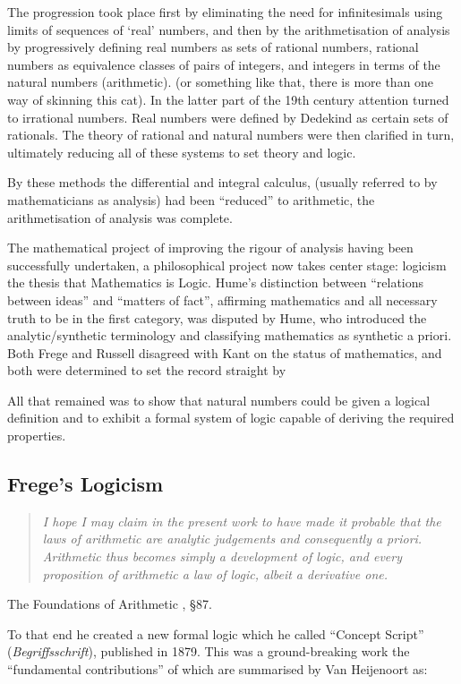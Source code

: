 \documentclass[10pt,titlepage]{article}
\begin{document}
The progression took place first by eliminating the need for infinitesimals using limits of sequences of `real' numbers, and then by the arithmetisation of analysis by progressively defining real numbers as sets of rational numbers, rational numbers as equivalence classes of pairs of integers, and integers in terms of the natural numbers (arithmetic). (or something like that, there is more than one way of skinning this cat).
In the latter part of the 19th century attention turned to irrational numbers.
Real numbers were defined by Dedekind as certain sets of rationals.
The theory of rational and natural numbers were then clarified in turn, ultimately reducing all of these systems to set theory and logic.

By these methods the differential and integral calculus, (usually referred to by mathematicians as analysis) had been ``reduced'' to arithmetic, the arithmetisation of analysis was complete.

The mathematical project of improving the rigour of analysis having been successfully undertaken, a philosophical project now takes center stage: logicism the thesis that Mathematics is Logic.
Hume's distinction between ``relations between ideas'' and ``matters of fact'', affirming mathematics and all necessary truth to be in the first category, was disputed by Hume, who introduced the analytic/synthetic terminology and classifying mathematics as synthetic a priori.
Both Frege and Russell disagreed with Kant on the status of mathematics, and both were determined to set the record straight by

All that remained was to show that natural numbers could be given a logical definition and to exhibit a formal system of logic capable of deriving the required properties.

\subsection{Frege's Logicism}

\begin{quote}
{\it  I hope I may claim in the present work to have made it probable that the laws of arithmetic are analytic judgements and consequently \emph{a priori}.
Arithmetic thus becomes simply a development of logic, and every proposition of arithmetic a law of logic, albeit a derivative one.}
\end{quote}
The Foundations of Arithmetic \cite{frege1884}, §87.

To that end he created a new formal logic which he called ``Concept Script'' ({\it Begriffsschrift})\cite{heijenoort67,frege1879}, published in 1879.
This was a ground-breaking work the ``fundamental contributions'' of which are summarised by Van Heijenoort as:
\end{document}
